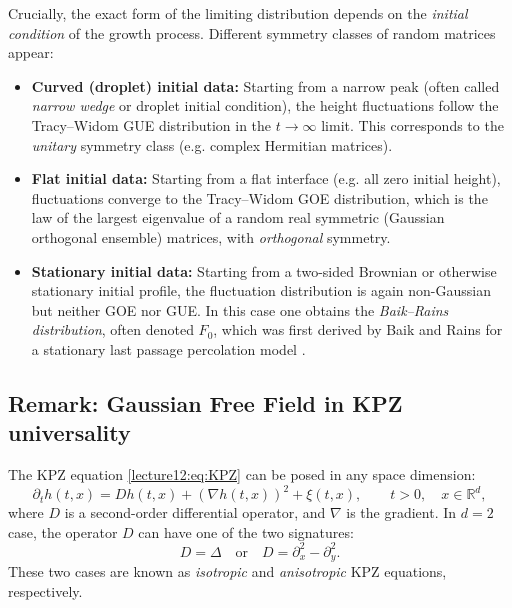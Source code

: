 \documentclass[letterpaper,11pt,oneside,reqno]{book}
\numberwithin{equation}{chapter}  %
\theoremstyle{definition}
\begin{document}
Crucially, the exact form of the limiting distribution depends on the \emph{initial condition} of the growth process. Different symmetry classes of random matrices appear:
\begin{itemize}
		\item \textbf{Curved (droplet) initial data:} Starting
			from a narrow peak (often called \emph{narrow wedge}
			or droplet initial condition), the height fluctuations
			follow the Tracy--Widom GUE distribution in the
			$t\to\infty$ limit. This
			corresponds to the \emph{unitary} symmetry
			class (e.g. complex Hermitian matrices).

		\item \textbf{Flat initial data:} Starting from a flat
			interface (e.g. all zero initial height), fluctuations
			converge to the Tracy--Widom GOE distribution,
			which is the law of the
			largest eigenvalue of a random real symmetric (Gaussian
			orthogonal ensemble) matrices, with \emph{orthogonal} symmetry.

		\item \textbf{Stationary initial data:} Starting from a
			two-sided Brownian or otherwise stationary initial
			profile, the fluctuation distribution is
			again non-Gaussian but neither GOE nor GUE. In this
			case one obtains the \emph{Baik--Rains distribution},
			often denoted $F_0$, which was first derived by Baik
			and Rains for a stationary last passage percolation
			model \cite{baik2000limiting_BR_distribution}.
\end{itemize}

\subsection{Remark: Gaussian Free Field in KPZ universality}

The KPZ equation \eqref{lecture12:eq:KPZ} can be posed in any space dimension:
\begin{equation*}
	\partial_t h(t,x)= D h(t,x) + (\nabla h(t,x))^2 + \xi(t,x),
	\qquad t>0,\quad x\in\mathbb{R}^d,
\end{equation*}
where $D$ is a second-order differential operator, and $\nabla$ is the gradient.
In $d=2$ case, the operator $D$ can have one of the two signatures:
\begin{equation*}
	D=\Delta \quad \text{or} \quad D=\partial_x^2-\partial_y^2.
\end{equation*}
These two cases are known as \emph{isotropic} and \emph{anisotropic} KPZ equations, respectively.
\end{document}
